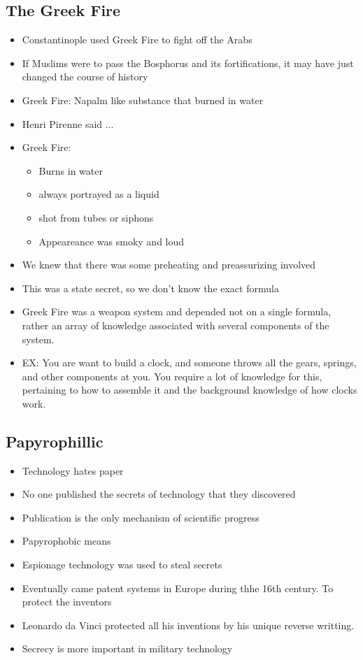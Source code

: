 \documentclass{article}
\begin{document}
\subsection{The Greek Fire}
\begin{itemize}
  \item Constantinople used Greek Fire to fight off the Arabs
  \item If Muslims were to pass the Bosphorus and its fortifications,
    it may have just changed the course of history
  \item Greek Fire: Napalm like substance that burned in water
  \item Henri Pirenne said ...
  \item Greek Fire:
    \begin{itemize}
      \item Burns in water
      \item always portrayed as a liquid
      \item shot from tubes or siphons
      \item Appeareance was smoky and loud
    \end{itemize}
  \item We knew that there was some preheating and preassurizing involved
  \item This was a state secret, so we don't know the exact formula
  \item Greek Fire was a weapon system and depended not on a single formula,
    rather an array of knowledge associated with several
    components of the system.
  \item EX: You are want to build a clock, and someone throws all the
    gears, springs, and other components at you. You require a lot of knowledge for this, pertaining
    to how to assemble it and the background knowledge of how clocks work.
\end{itemize}

\subsection{Papyrophillic}
\begin{itemize}
  \item Technology hates paper
  \item No one published the secrets of technology
    that they discovered
  \item Publication is the only mechanism of scientific progress
  \item Papyrophobic means
  \item Espionage technology was used to steal secrets
  \item Eventually came patent systems
    in Europe during thhe 16th century.
    To protect the inventors
  \item Leonardo da Vinci protected all his inventions
    by his unique reverse writting.
  \item Secrecy is more important in military technology
\end{itemize}
\end{document}
